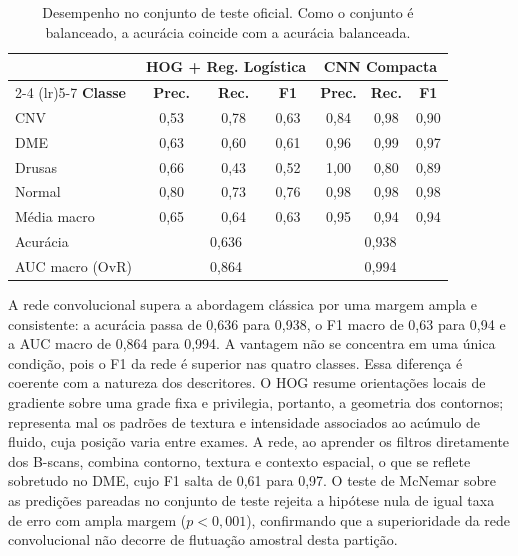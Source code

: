 \documentclass[conference]{IEEEtran}
\begin{document}
\begin{table}[t]
\caption{Desempenho no conjunto de teste oficial. Como o conjunto é balanceado, a acurácia coincide com a acurácia balanceada.}
\label{tab:results}
\centering
\footnotesize
\setlength{\tabcolsep}{4pt}
\renewcommand{\arraystretch}{1.15}
\begin{tabular}{l ccc ccc}
\toprule
 & \multicolumn{3}{c}{\textbf{HOG + Reg. Logística}} & \multicolumn{3}{c}{\textbf{CNN Compacta}} \\
\cmidrule(lr){2-4} \cmidrule(lr){5-7}
\textbf{Classe} & \textbf{Prec.} & \textbf{Rec.} & \textbf{F1} & \textbf{Prec.} & \textbf{Rec.} & \textbf{F1} \\
\midrule
CNV    & 0,53 & 0,78 & 0,63 & 0,84 & 0,98 & 0,90 \\
DME    & 0,63 & 0,60 & 0,61 & 0,96 & 0,99 & 0,97 \\
Drusas & 0,66 & 0,43 & 0,52 & 1,00 & 0,80 & 0,89 \\
Normal & 0,80 & 0,73 & 0,76 & 0,98 & 0,98 & 0,98 \\
\midrule
Média macro & 0,65 & 0,64 & 0,63 & 0,95 & 0,94 & 0,94 \\
\midrule
Acurácia & \multicolumn{3}{c}{0,636} & \multicolumn{3}{c}{0,938} \\
AUC macro (OvR) & \multicolumn{3}{c}{0,864} & \multicolumn{3}{c}{0,994} \\
\bottomrule
\end{tabular}
\end{table}

A rede convolucional supera a abordagem clássica por uma margem ampla e consistente: a acurácia passa de 0,636 para 0,938, o F1 macro de 0,63 para 0,94 e a AUC macro de 0,864 para 0,994. A vantagem não se concentra em uma única condição, pois o F1 da rede é superior nas quatro classes. Essa diferença é coerente com a natureza dos descritores. O HOG resume orientações locais de gradiente sobre uma grade fixa e privilegia, portanto, a geometria dos contornos; representa mal os padrões de textura e intensidade associados ao acúmulo de fluido, cuja posição varia entre exames. A rede, ao aprender os filtros diretamente dos B-scans, combina contorno, textura e contexto espacial, o que se reflete sobretudo no DME, cujo F1 salta de 0,61 para 0,97. O teste de McNemar sobre as predições pareadas no conjunto de teste rejeita a hipótese nula de igual taxa de erro com ampla margem ($p < 0{,}001$), confirmando que a superioridade da rede convolucional não decorre de flutuação amostral desta partição.
\end{document}
